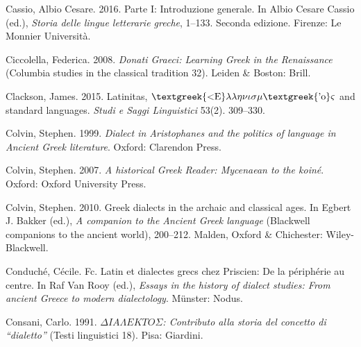 \begin{styleStandard}
Cassio, Albio Cesare. 2016. Parte I: Introduzione generale. In Albio Cesare Cassio (ed.), \textit{Storia delle lingue letterarie greche}, 1–133. Seconda edizione. Firenze: Le Monnier Università.
\end{styleStandard}

\begin{styleStandard}
Ciccolella, Federica. 2008. \textit{Donati Graeci: Learning Greek in the Renaissance} (Columbia studies in the classical tradition 32). Leiden \& Boston: Brill.
\end{styleStandard}

\begin{styleStandard}
Clackson, James. 2015. Latinitas, $\text{\textgreek{<E}}\lambda \lambda \eta \nu \iota \sigma \mu \text{\textgreek{'o}}\varsigma $ and standard languages. \textit{Studi e Saggi Linguistici} 53(2). 309–330.
\end{styleStandard}

\begin{styleStandard}
Colvin, Stephen. 1999. \textit{Dialect in Aristophanes and the politics of language in Ancient Greek literature}. Oxford: Clarendon Press.
\end{styleStandard}

\begin{styleStandard}
Colvin, Stephen. 2007. \textit{A historical Greek Reader: Mycenaean to the koiné}. Oxford: Oxford University Press.
\end{styleStandard}

\begin{styleStandard}
Colvin, Stephen. 2010. Greek dialects in the archaic and classical ages. In Egbert J. Bakker (ed.), \textit{A companion to the Ancient Greek language} (Blackwell companions to the ancient world), 200–212. Malden, Oxford \& Chichester: Wiley-Blackwell.
\end{styleStandard}

\begin{styleStandard}
Conduché, Cécile. Fc. Latin et dialectes grecs chez Priscien: De la périphérie au centre. In Raf Van Rooy (ed.), \textit{Essays in the history of dialect studies: From ancient Greece to modern dialectology}. Münster: Nodus.
\end{styleStandard}

\begin{styleStandard}
Consani, Carlo. 1991. \textit{$\Delta IA\Lambda EKTO\Sigma $: Contributo alla storia del concetto di “dialetto”} (Testi linguistici 18). Pisa: Giardini.
\end{styleStandard}

